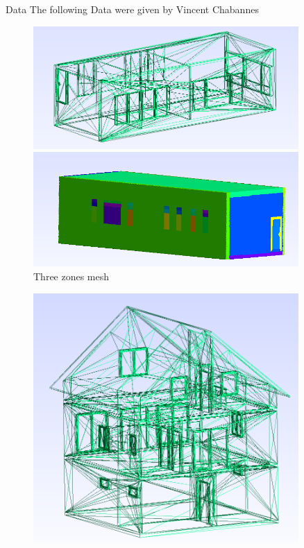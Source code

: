 \documentclass[10pt]{beamer}
\begin{document}
\begin{frame}{Data}
    The following Data were given by Vincent Chabannes
    \begin{figure}
        \begin{minipage}{0.33\textwidth}
            \centering
            \includegraphics[width=0.9\textwidth]{../image/3zones_stl.png}
        \end{minipage}%
        \begin{minipage}{0.33\textwidth}
            \centering
            \includegraphics[width=0.9\textwidth]{../image/label_three_zone.png}
        \end{minipage}
        \caption{Three zones mesh}
    \end{figure}
    \begin{figure}
        \begin{minipage}{0.33\textwidth}
            \centering
            \includegraphics[width=0.9\textwidth]{../image/jasmin_stl.png}

\end{minipage}
\end{figure}
\end{frame}
\end{document}

